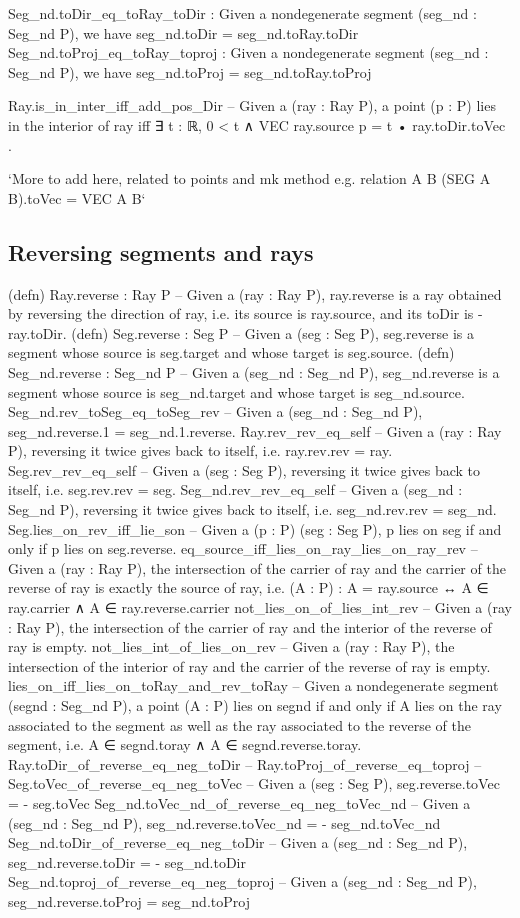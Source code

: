 \documentclass[12pt,a4paper]{article}
\begin{document}
    Seg_nd.toDir_eq_toRay_toDir : Given a nondegenerate segment (seg_nd : Seg_nd P), we have seg_nd.toDir = seg_nd.toRay.toDir
    Seg_nd.toProj_eq_toRay_toproj : Given a nondegenerate segment (seg_nd : Seg_nd P), we have seg_nd.toProj = seg_nd.toRay.toProj

    Ray.is_in_inter_iff_add_pos_Dir -- Given a (ray : Ray P), a point (p : P) lies in the interior of ray iff  ∃ t : ℝ, 0 < t ∧ VEC ray.source p = t • ray.toDir.toVec .

    `More to add here, related to points and mk method e.g. relation A B (SEG A B).toVec = VEC A B`

\subsection{Reversing segments and rays}

    (defn) Ray.reverse : Ray P -- Given a (ray : Ray P), ray.reverse is a ray obtained by reversing the direction of ray, i.e. its source is ray.source, and its toDir is - ray.toDir.
    (defn) Seg.reverse : Seg P -- Given a (seg : Seg P), seg.reverse is a segment whose source is seg.target and whose target is seg.source.
    (defn) Seg_nd.reverse : Seg_nd P -- Given a (seg_nd : Seg_nd P), seg_nd.reverse is a segment whose source is seg_nd.target and whose target is seg_nd.source.
    Seg_nd.rev_toSeg_eq_toSeg_rev -- Given a (seg_nd : Seg_nd P), seg_nd.reverse.1 = seg_nd.1.reverse.
    Ray.rev_rev_eq_self -- Given a (ray : Ray P), reversing it twice gives back to itself, i.e. ray.rev.rev = ray.
    Seg.rev_rev_eq_self -- Given a (seg : Seg P), reversing it twice gives back to itself, i.e. seg.rev.rev = seg.
    Seg_nd.rev_rev_eq_self -- Given a (seg_nd : Seg_nd P), reversing it twice gives back to itself, i.e. seg_nd.rev.rev = seg_nd.
    Seg.lies_on_rev_iff_lie_son -- Given a (p : P) (seg : Seg P), p lies on seg if and only if p lies on seg.reverse.
    eq_source_iff_lies_on_ray_lies_on_ray_rev -- Given a (ray : Ray P), the intersection of the carrier of ray and the carrier of the reverse of ray is exactly the source of ray, i.e. (A : P) : A = ray.source ↔ A ∈ ray.carrier ∧ A ∈ ray.reverse.carrier
    not_lies_on_of_lies_int_rev -- Given a (ray : Ray P), the intersection of the carrier of ray and the interior of the reverse of ray is empty.
    not_lies_int_of_lies_on_rev -- Given a (ray : Ray P), the intersection of the interior of ray and the carrier of the reverse of ray is empty.
    lies_on_iff_lies_on_toRay_and_rev_toRay -- Given a nondegenerate segment (segnd : Seg_nd P), a point (A : P) lies on segnd if and only if A lies on the ray associated to the segment as well as the ray associated to the reverse of the segment, i.e. A ∈ segnd.toray ∧ A ∈ segnd.reverse.toray.
    Ray.toDir_of_reverse_eq_neg_toDir --
    Ray.toProj_of_reverse_eq_toproj --
    Seg.toVec_of_reverse_eq_neg_toVec -- Given a (seg : Seg P), seg.reverse.toVec = - seg.toVec
    Seg_nd.toVec_nd_of_reverse_eq_neg_toVec_nd -- Given a (seg_nd : Seg_nd P), seg_nd.reverse.toVec_nd = - seg_nd.toVec_nd
    Seg_nd.toDir_of_reverse_eq_neg_toDir -- Given a (seg_nd : Seg_nd P), seg_nd.reverse.toDir = - seg_nd.toDir
    Seg_nd.toproj_of_reverse_eq_neg_toproj -- Given a (seg_nd : Seg_nd P), seg_nd.reverse.toProj = seg_nd.toProj
\end{document}
